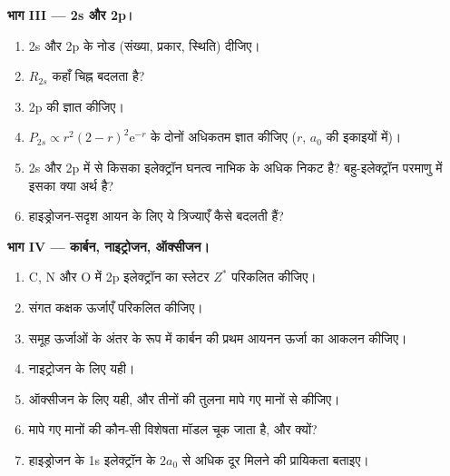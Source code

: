 \begin{problem}
\medskip
\noindent\textbf{भाग III --- 2s और 2p।}
\begin{enumerate}[resume]
  \item 2s और 2p के नोड (संख्या, प्रकार, स्थिति) दीजिए।
  \item $R_{2s}$ कहाँ चिह्न बदलता है?
  \item 2p की  ज्ञात कीजिए।
  \item $P_{2s} \propto r^2(2 - r)^2\mathrm e^{-r}$ के दोनों अधिकतम ज्ञात कीजिए ($r$, $a_0$ की
        इकाइयों में)।
  \item 2s और 2p में से किसका इलेक्ट्रॉन घनत्व नाभिक के अधिक निकट है? बहु-इलेक्ट्रॉन
        परमाणु में इसका क्या अर्थ है?
  \item हाइड्रोजन-सदृश आयन  के लिए ये त्रिज्याएँ कैसे बदलती हैं?
\end{enumerate}

\medskip
\noindent\textbf{भाग IV --- कार्बन, नाइट्रोजन, ऑक्सीजन।}
\begin{enumerate}[resume]
  \item C, N और O में 2p इलेक्ट्रॉन का स्लेटर $Z^*$ परिकलित कीजिए।
  \item संगत कक्षक ऊर्जाएँ परिकलित कीजिए।
  \item समूह ऊर्जाओं के अंतर के रूप में कार्बन की प्रथम आयनन ऊर्जा का
        आकलन कीजिए।
  \item नाइट्रोजन के लिए यही।
  \item ऑक्सीजन के लिए यही, और तीनों की तुलना मापे गए मानों से कीजिए।
  \item मापे गए मानों की कौन-सी विशेषता मॉडल चूक जाता है, और क्यों?
  \item हाइड्रोजन के 1s इलेक्ट्रॉन के $2a_0$ से अधिक दूर मिलने की प्रायिकता
        बताइए।
\end{enumerate}
\end{problem}
